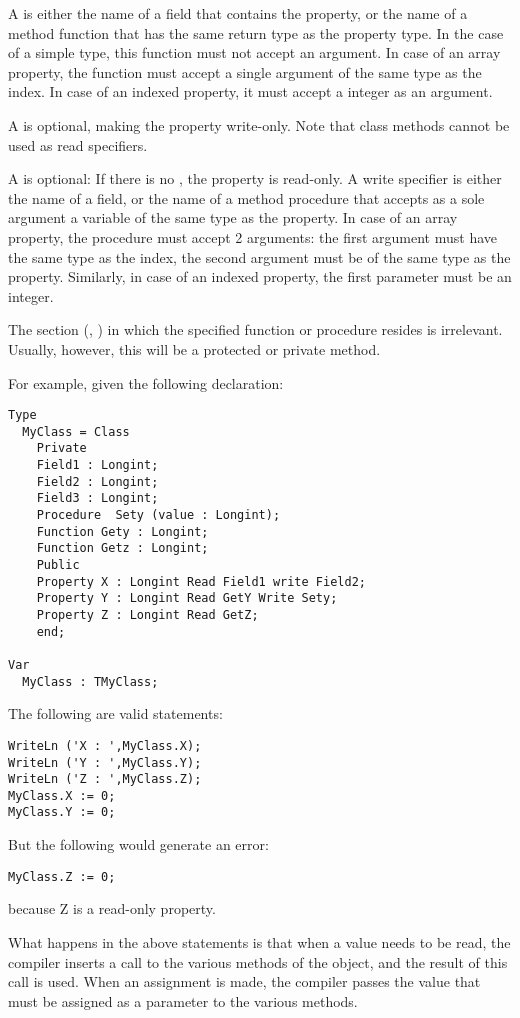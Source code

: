 A   is either the name of a field that contains the
property, or the name of a method function that has the same return type as
the property type. In the case of a simple type, this
function must not accept an argument. In case of an array property, the
function must accept a single argument of the same type as the index.
In case of an indexed property, it must accept a integer as an argument.

A  is optional, making the property write-only. 
Note that class methods cannot be used as read specifiers.

A   is optional: If there is no , the
property is read-only. A write specifier is either the name of a field, or
the name of a method procedure that accepts as a sole argument a variable of
the same type as the property. In case of an array property, the procedure
must accept 2 arguments: the first argument must have the same type as the
index, the second argument must be of the same type as the property.
Similarly, in case of an indexed property, the first parameter must be an integer.

The section  (, ) 
in which the specified function or procedure resides is irrelevant. Usually, 
however, this will be a protected or private method.

For example, given the following declaration:
\begin{verbatim}
Type
  MyClass = Class
    Private
    Field1 : Longint;
    Field2 : Longint;
    Field3 : Longint;
    Procedure  Sety (value : Longint);
    Function Gety : Longint;
    Function Getz : Longint;
    Public
    Property X : Longint Read Field1 write Field2;
    Property Y : Longint Read GetY Write Sety;
    Property Z : Longint Read GetZ;
    end;

Var 
  MyClass : TMyClass;
\end{verbatim}
The following are valid statements:
\begin{verbatim}
WriteLn ('X : ',MyClass.X);
WriteLn ('Y : ',MyClass.Y);
WriteLn ('Z : ',MyClass.Z);
MyClass.X := 0;
MyClass.Y := 0;
\end{verbatim}
But the following would generate an error:
\begin{verbatim}
MyClass.Z := 0;
\end{verbatim}
because Z is a read-only property.

What happens in the above statements is that when a value needs to be read,
the compiler inserts a call to the various  methods of the
object, and the result of this call is used. When an assignment is made,
the compiler passes the value that must be assigned as a parameter to
the various  methods.

